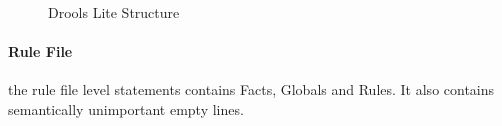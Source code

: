 \begin{figure}[htbp]
    \centering
    \caption{Drools Lite Structure}
    \label{fig:DroolsLiteDiagram}
\end{figure}

\paragraph{Rule File} the rule file level statements contains Facts, Globals and Rules.
It also contains semantically unimportant empty lines.

